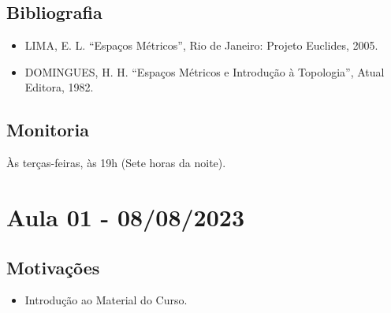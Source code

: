 \documentclass{article}
\begin{document}
\subsection{Bibliografia}
 \begin{itemize}
   \item LIMA, E. L.  ``Espaços Métricos'', Rio de Janeiro: Projeto Euclides, 2005.
   \item DOMINGUES, H. H. ``Espaços Métricos e Introdução à Topologia'', Atual Editora, 1982.
 \end{itemize}
\subsection*{Monitoria}
  Às terças-feiras, às 19h (Sete horas da noite).

 \newpage

\section{Aula 01 - 08/08/2023}
\subsection{Motivações}
\begin{itemize}
  \item Introdução ao Material do Curso.
\end{itemize}
\end{document}
